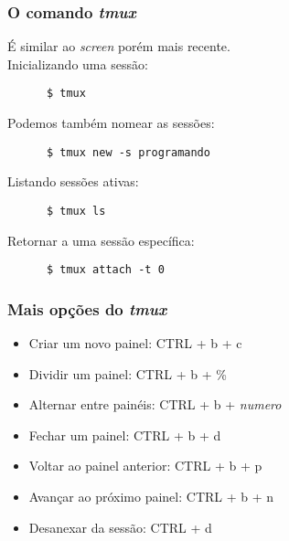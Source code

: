 \documentclass{beamer}
\begin{document}
   \begin{frame}[fragile]
      \frametitle{O comando \textit{tmux}}
      É similar ao \textit{screen} porém mais recente. \\ 
      Inicializando uma sessão:
      \begin{verbatim}
      $ tmux	      
      \end{verbatim}
      Podemos também nomear as sessões:
      \begin{verbatim}
      $ tmux new -s programando	      
      \end{verbatim}
      Listando sessões ativas:
      \begin{verbatim}
      $ tmux ls
      \end{verbatim}
      Retornar a uma sessão específica:
      \begin{verbatim}
      $ tmux attach -t 0 
      \end{verbatim}
\end{frame}

   \begin{frame}
      \frametitle{Mais opções do \textit{tmux}}
      \begin{itemize}
         \item Criar um novo painel: CTRL + b + c
         \item Dividir um painel: CTRL + b + \%
         \item Alternar entre painéis: CTRL + b + \textit{numero}
         \item Fechar um painel: CTRL + b + d
         \item Voltar ao painel anterior: CTRL + b + p
         \item Avançar ao próximo painel: CTRL + b + n
         \item Desanexar da sessão: CTRL + d
      \end{itemize}
   \end{frame}


\end{document}
